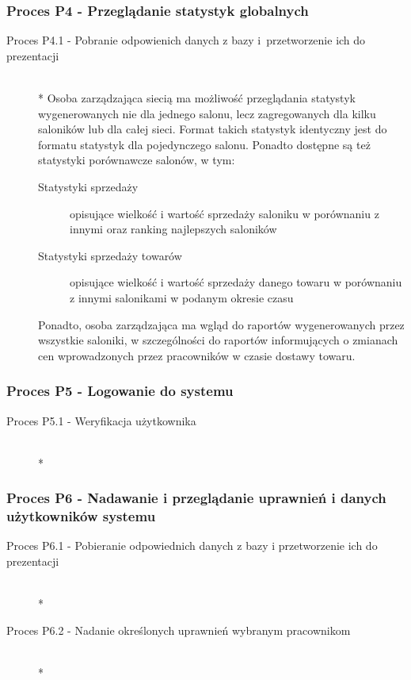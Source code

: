 \subsubsection{Proces P4 - Przeglądanie statystyk globalnych}
\begin{description}
\item[Proces P4.1 - Pobranie odpowienich danych z bazy i~przetworzenie ich do prezentacji] ~\\*
Osoba zarządzająca siecią ma możliwość przeglądania statystyk wygenerowanych nie dla jednego salonu, lecz zagregowanych dla kilku saloników lub dla całej sieci. Format takich statystyk identyczny jest do formatu statystyk dla pojedynczego salonu. Ponadto dostępne są też statystyki porównawcze salonów, w tym:
\begin{description}
\item[Statystyki sprzedaży] opisujące wielkość i wartość sprzedaży saloniku w porównaniu z innymi oraz ranking najlepszych saloników
\item[Statystyki sprzedaży towarów] opisujące wielkość i wartość sprzedaży danego towaru w porównaniu z innymi salonikami w podanym okresie czasu
\end{description}
Ponadto, osoba zarządzająca ma wgląd do raportów wygenerowanych przez wszystkie saloniki, w szczególności do raportów informujących o zmianach cen wprowadzonych przez pracowników w czasie dostawy towaru.
\end{description}
\subsubsection{Proces P5 - Logowanie do systemu}
\begin{description}
\item[Proces P5.1 - Weryfikacja użytkownika] ~\\*
\end{description}
\subsubsection{Proces P6 - Nadawanie i przeglądanie uprawnień i danych użytkowników systemu}
\begin{description}
\item[Proces P6.1 - Pobieranie odpowiednich danych z bazy i przetworzenie ich do prezentacji] ~\\*
\item[Proces P6.2 - Nadanie określonych uprawnień wybranym pracownikom] ~\\*
\end{description}
